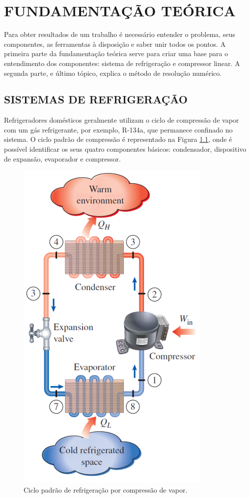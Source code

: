 \chapter{FUNDAMENTAÇÃO TEÓRICA}\label{cap:desenvolvimento}

Para obter resultados de um trabalho é necessário entender o problema, seus componentes, as ferramentas à disposição e saber unir todos os pontos. A primeira parte da fundamentação teórica serve para criar uma base para o entendimento dos componentes: sistema de refrigeração e compressor linear. A segunda parte, e último tópico, explica o método de resolução numérico.

\section{SISTEMAS DE REFRIGERAÇÃO}

Refrigeradores domésticos geralmente utilizam o ciclo de compressão de vapor com um gás refrigerante, por exemplo, R-134a, que permanece confinado no sistema. O ciclo padrão de compressão é representado na Figura \ref{fig:Fig_1}, onde é possível identificar os seus quatro componentes básicos: condensador, dispositivo de expansão, evaporador e compressor.

\begin{figure}[htb]
	\caption{\label{fig:Fig_1}Ciclo padrão de refrigeração por compressão de vapor.}
	\begin{center}
		\includegraphics[scale=0.65]{images/refrigerador.png}
	\end{center}
\end{figure}

